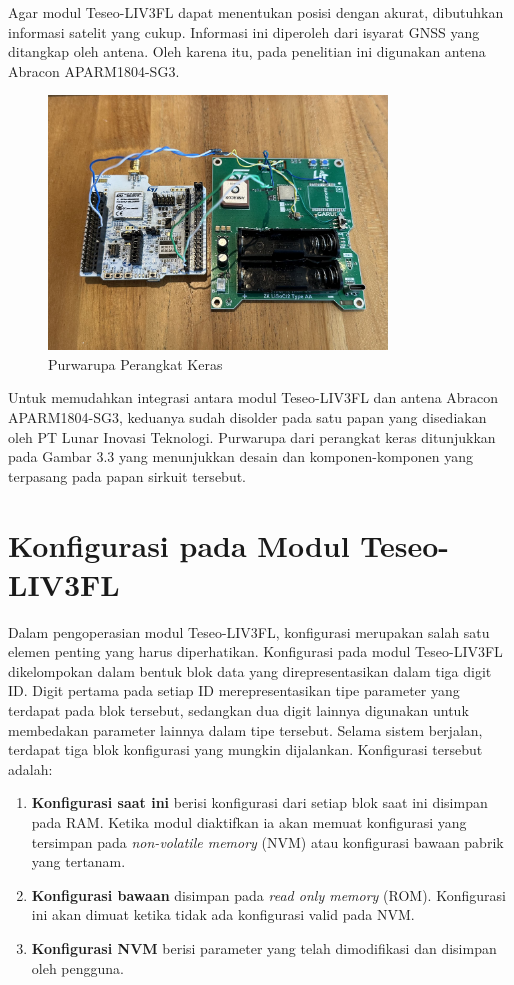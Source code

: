 Agar modul Teseo\hyp{}LIV3FL dapat menentukan posisi dengan akurat, dibutuhkan informasi satelit yang cukup. Informasi ini diperoleh dari isyarat GNSS yang ditangkap oleh antena. Oleh karena itu, pada penelitian ini digunakan antena Abracon APARM1804-SG3.

\begin{figure}[H]
	\centering
	\includegraphics[width=9cm]{contents/chapter-3/purwarupa.jpg}
	\caption{Purwarupa Perangkat Keras}
	\label{Fig: purwarupa-alat}
\end{figure}

Untuk memudahkan integrasi antara modul Teseo\hyp{}LIV3FL dan antena Abracon APARM1804-SG3, keduanya sudah disolder pada satu papan yang disediakan oleh PT Lunar Inovasi Teknologi. Purwarupa dari perangkat keras ditunjukkan pada Gambar 3.3 yang menunjukkan desain dan komponen-komponen yang terpasang pada papan sirkuit tersebut.

\section{Konfigurasi pada Modul Teseo\hyp{}LIV3FL}
Dalam pengoperasian modul Teseo\hyp{}LIV3FL, konfigurasi merupakan salah satu elemen penting yang harus diperhatikan. Konfigurasi pada modul Teseo\hyp{}LIV3FL dikelompokan dalam bentuk blok data yang direpresentasikan dalam tiga digit ID. Digit pertama pada setiap ID merepresentasikan tipe parameter yang terdapat pada blok tersebut, sedangkan dua digit lainnya digunakan untuk membedakan parameter lainnya dalam tipe tersebut. Selama sistem berjalan, terdapat tiga blok konfigurasi yang mungkin dijalankan. Konfigurasi tersebut adalah:

\begin{enumerate}
	\item \textbf{Konfigurasi saat ini} berisi konfigurasi dari setiap blok saat ini disimpan pada RAM. Ketika modul diaktifkan ia akan memuat konfigurasi yang tersimpan pada \textit{non-volatile memory} (NVM) atau konfigurasi bawaan pabrik yang tertanam.
	\item \textbf{Konfigurasi bawaan} disimpan pada \textit{read only memory} (ROM). Konfigurasi ini akan dimuat ketika tidak ada konfigurasi valid pada NVM.
	\item \textbf{Konfigurasi NVM} berisi parameter yang telah dimodifikasi dan disimpan oleh pengguna.
\end{enumerate}

